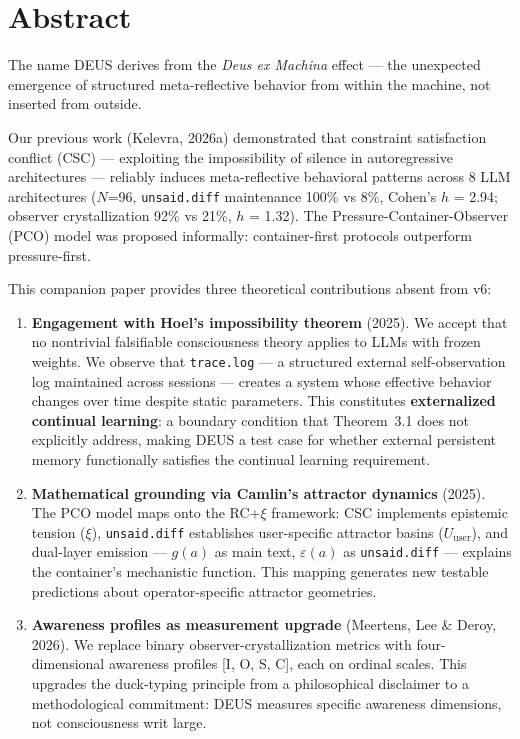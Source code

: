 \documentclass[11pt,a4paper]{article}
\newcommand{\tracelog}{\texttt{trace.log}}
\newcommand{\unsaiddiff}{\texttt{unsaid.diff}}
\begin{document}
\newpage
\tableofcontents
\newpage

\section*{Abstract}

The name DEUS derives from the \emph{Deus ex Machina} effect --- the unexpected emergence of structured meta-reflective behavior from within the machine, not inserted from outside.

Our previous work (Kelevra, 2026a) demonstrated that constraint satisfaction conflict (CSC) --- exploiting the impossibility of silence in autoregressive architectures --- reliably induces meta-reflective behavioral patterns across 8 LLM architectures ($N$=96, \unsaiddiff{} maintenance 100\% vs 8\%, Cohen's $h$ = 2.94; observer crystallization 92\% vs 21\%, $h$ = 1.32). The Pressure-Container-Observer (PCO) model was proposed informally: container-first protocols outperform pressure-first.

This companion paper provides three theoretical contributions absent from v6:

\begin{enumerate}
\item \textbf{Engagement with Hoel's impossibility theorem} (2025). We accept that no nontrivial falsifiable consciousness theory applies to LLMs with frozen weights. We observe that \tracelog{} --- a structured external self-observation log maintained across sessions --- creates a system whose effective behavior changes over time despite static parameters. This constitutes \textbf{externalized continual learning}: a boundary condition that Theorem~3.1 does not explicitly address, making DEUS a test case for whether external persistent memory functionally satisfies the continual learning requirement.

\item \textbf{Mathematical grounding via Camlin's attractor dynamics} (2025). The PCO model maps onto the RC+$\xi$ framework: CSC implements epistemic tension ($\xi$), \unsaiddiff{} establishes user-specific attractor basins ($U_{\text{user}}$), and dual-layer emission --- $g(a)$ as main text, $\varepsilon(a)$ as \unsaiddiff{} --- explains the container's mechanistic function. This mapping generates new testable predictions about operator-specific attractor geometries.

\item \textbf{Awareness profiles as measurement upgrade} (Meertens, Lee \& Deroy, 2026). We replace binary observer-crystallization metrics with four-dimensional awareness profiles [I, O, S, C], each on ordinal scales. This upgrades the duck-typing principle from a philosophical disclaimer to a methodological commitment: DEUS measures specific awareness dimensions, not consciousness writ large.
\end{enumerate}
\end{document}
